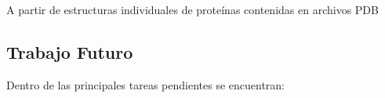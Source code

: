 A partir de estructuras individuales de proteínas contenidas en archivos PDB

\subsection{Trabajo Futuro}
 Dentro de las principales tareas pendientes se encuentran:



